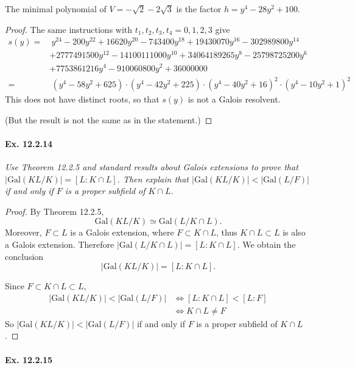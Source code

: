 \documentclass[11pt,a4paper]{article}
\newcommand{\Gal}{\mathrm{Gal}}
\begin{document}
The minimal polynomial of $V = -\sqrt{2} - 2 \sqrt{3}$ is the factor $h = y^{4} - 28y^{2} +100$.
\begin{proof}

The same instructions with $t_1,t_2,t_3,t_4 = 0,1,2,3$ give
\begin{align*}
s(y) =&\  y^{24} - 200y^{22} + 16620y^{20} - 743400y^{18} + 19430070y^{16} -
302989800y^{14}\\
& + 2777491500y^{12} - 14100111000y^{10} +
34064189265y^{8} - 25798725200y^{6}\\
& + 7753861216y^{4} - 910060800y^{2} +
36000000\\
= &\ (y^{4} - 58y^{2} + 625) \cdot (y^{4} - 42y^{2} + 225) \cdot (y^{4} -
40y^{2} + 16)^{2} \cdot (y^{4} - 10y^{2} + 1)^{2}
\end{align*}
This does not have distinct roots, so that $s(y)$ is not a Galois resolvent.

(But the result is not the same as in the statement.)
\end{proof}

\paragraph{Ex. 12.2.14}

{\it Use Theorem 12.2.5 and standard results about Galois extensions to prove that $|\Gal(KL/K)| = [L:K\cap L]$. Then explain that $|\Gal(KL/K)| < |\Gal(L/F)|$ if and only if $F$ is a proper subfield of $K\cap L$.
}

\begin{proof}
By Theorem 12.2.5, 
$$\Gal(KL/K) \simeq \Gal(L/K\cap L).$$
Moreover, $F \subset L$ is a Galois extension, where $F \subset K \cap L$, thus $K \cap L \subset L$ is also a Galois extension. Therefore $|\Gal(L/K\cap L)| = [L : K \cap L]$. We obtain the conclusion
$$|\Gal(KL/K)| = [L:K\cap L].$$

Since $F \subset K \cap L \subset L$,
\begin{align*}
|\Gal(KL/K)| < |\Gal(L/F)| &\iff  [L:K\cap L] < [L:F]\\
&\iff K \cap L \ne F
\end{align*}
So  $|\Gal(KL/K)| < |\Gal(L/F)|$ if and only if $F$ is a proper subfield of $K\cap L$.
\end{proof}

\paragraph{Ex. 12.2.15}
\end{document}
